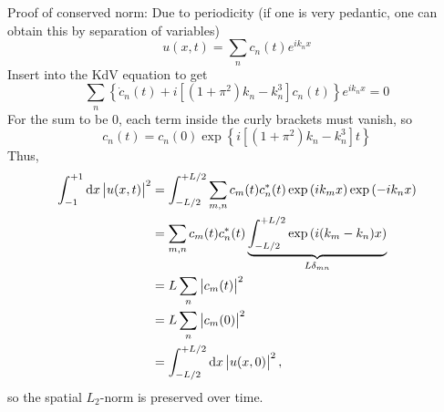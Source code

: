 Proof of conserved norm:
Due to periodicity (if one is very pedantic, one can obtain this by separation of variables)
\begin{equation}
	u(x, t) = \sum_n c_n(t) e^{i k_n x}
\end{equation}
Insert into the KdV equation to get
\begin{equation}
	\sum_n \left\{ \dot{c}_n(t) + i [(1+\pi^2)k_n - k_n^3] c_n(t) \right\} e^{i k_n x}= 0
\end{equation}
For the sum to be $0$, each term inside the curly brackets must vanish, so
\begin{equation}
	c_n(t) = c_n(0) \exp{\left\{ i [(1+\pi^2)k_n - k_n^3] t \right\} }
\end{equation}
Thus,
\begin{equation}
\begin{split}
\int_{-1}^{+1} \dif x \left| u(x,t) \right|^2 &= \int_{-L/2}^{+L/2} \sum_{m,n} c_m(t) c_n^*(t) \exp{(i k_m x)} \exp{(-i k_n x)} \\
                                              &= \sum_{m,n} c_m(t) c_n^*(t) \underbrace{\int_{-L/2}^{+L/2} \exp{(i(k_m-k_n)x)}}_{L \delta_{m n}} \\
											  &= L \sum_n \left| c_m(t) \right|^2 \\
											  &= L \sum_n \left| c_m(0) \right|^2 \\
											  &= \int_{-L/2}^{+L/2} \dif x \left| u(x,0) \right|^2,
\end{split}
\end{equation}
so the spatial $L_2$-norm is preserved over time.

